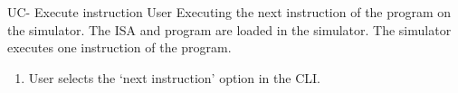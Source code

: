 \begin{useCase}{UC-}
  {Execute instruction}  %
  {User}  %
  {Executing the next instruction of the program on the simulator.}  %
  {The \gls{ISA} and program are loaded in the simulator.}  %
  {The simulator executes one instruction of the program.}  %
  \begin{enumerate}[leftmargin=*, topsep=0pt, noitemsep]  %
    \item User selects the `next instruction' option in the \gls{CLI}.
  \end{enumerate}
\end{useCase}

